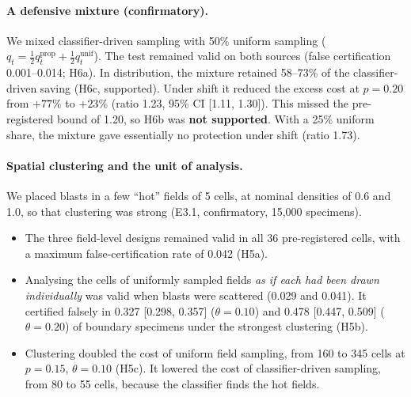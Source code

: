 \documentclass[11pt]{article}
\theoremstyle{remark}
\theoremstyle{definition}
\begin{document}
\paragraph{A defensive mixture (confirmatory).} We mixed classifier-driven sampling with 50\% uniform sampling ($q_t=\tfrac12 q^{\text{prop}}_t+\tfrac12 q^{\text{unif}}_t$). The test remained valid on both sources (false certification 0.001--0.014; H6a). In distribution, the mixture retained 58--73\% of the classifier-driven saving (H6c, supported). Under shift it reduced the excess cost at $p=0.20$ from $+77\%$ to $+23\%$ (ratio 1.23, 95\% CI [1.11, 1.30]). This missed the pre-registered bound of 1.20, so H6b was \textbf{not supported}. With a 25\% uniform share, the mixture gave essentially no protection under shift (ratio 1.73).

\paragraph{Spatial clustering and the unit of analysis.} We placed blasts in a few ``hot'' fields of 5 cells, at nominal densities of 0.6 and 1.0, so that clustering was strong (E3.1, confirmatory, 15,000 specimens).
\begin{itemize}
\item The three field-level designs remained valid in all 36 pre-registered cells, with a maximum false-certification rate of 0.042 (H5a).
\item Analysing the cells of uniformly sampled fields \emph{as if each had been drawn individually} was valid when blasts were scattered (0.029 and 0.041). It certified falsely in 0.327 [0.298, 0.357] ($\theta=0.10$) and 0.478 [0.447, 0.509] ($\theta=0.20$) of boundary specimens under the strongest clustering (H5b).
\item Clustering doubled the cost of uniform field sampling, from 160 to 345 cells at $p=0.15$, $\theta=0.10$ (H5c). It lowered the cost of classifier-driven sampling, from 80 to 55 cells, because the classifier finds the hot fields.
\end{itemize}
\end{document}
